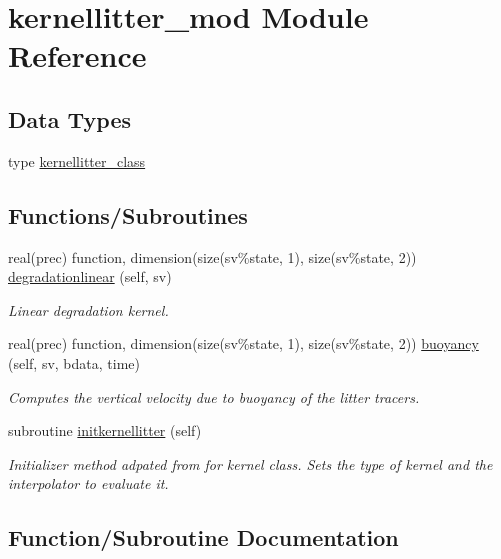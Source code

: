 \hypertarget{namespacekernellitter__mod}{}\section{kernellitter\+\_\+mod Module Reference}
\label{namespacekernellitter__mod}
\subsection*{Data Types}
\begin{DoxyCompactItemize}
\item 
type \mbox{\hyperlink{structkernellitter__mod_1_1kernellitter__class}{kernellitter\+\_\+class}}
\end{DoxyCompactItemize}
\subsection*{Functions/\+Subroutines}
\begin{DoxyCompactItemize}
\item 
real(prec) function, dimension(size(sv\%state, 1), size(sv\%state, 2)) \mbox{\hyperlink{namespacekernellitter__mod_ab3201eb9917816dbd1043be44120efcb}{degradationlinear}} (self, sv)
\begin{DoxyCompactList}\small\item\em Linear degradation kernel. \end{DoxyCompactList}\item 
real(prec) function, dimension(size(sv\%state, 1), size(sv\%state, 2)) \mbox{\hyperlink{namespacekernellitter__mod_a6dfc58ed5badd008180abb729e1bca82}{buoyancy}} (self, sv, bdata, time)
\begin{DoxyCompactList}\small\item\em Computes the vertical velocity due to buoyancy of the litter tracers. \end{DoxyCompactList}\item 
subroutine \mbox{\hyperlink{namespacekernellitter__mod_a145c58d91c7654c5c4f8beac04b608b6}{initkernellitter}} (self)
\begin{DoxyCompactList}\small\item\em Initializer method adpated from for kernel class. Sets the type of kernel and the interpolator to evaluate it. \end{DoxyCompactList}\end{DoxyCompactItemize}


\subsection{Function/\+Subroutine Documentation}
\mbox{\label{namespacekernellitter__mod_a6dfc58ed5badd008180abb729e1bca82}} 
